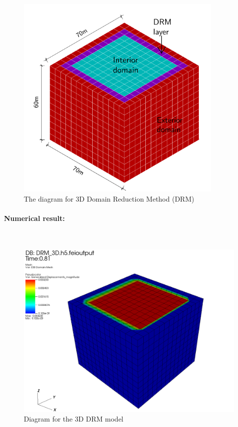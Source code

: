 \documentclass[fleqn,11pt]{article}
\begin{document}
\begin{figure}[H]
  \centering
  \includegraphics[width=10cm]{../Figure-files/DRM_3D_descp_3.pdf}
  \caption{The diagram for 3D Domain Reduction Method (DRM) }
  \label{fig The diagram for Domain Reduction Method DRM }
\end{figure}






\paragraph{Numerical result:} ~

\begin{figure}[H]
  \centering
  \includegraphics[width=15cm]{../Figure-files/3d_drm_result429.png}
  \caption{Diagram for the 3D DRM model}
  \label{fig Diagram for the 3D DRM model}
\end{figure}
\end{document}
